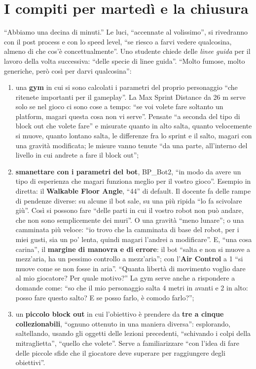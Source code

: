 \section{I compiti per martedì e la chiusura}
\label{ue13:sec:compiti}

``Abbiamo una decina di minuti.'' Le luci, ``accennate al volissimo'', si rivedranno con il
post process e con lo speed level, ``se riesco a farvi vedere qualcosina, almeno di che
cos'è concettualmente''. Uno studente chiede delle \emph{linee guida} per il lavoro della
volta successiva: ``delle specie di linee guida''. ``Molto fumose, molto generiche, però così
per darvi qualcosina'':
\begin{enumerate}
  \item una \textbf{gym} in cui si sono calcolati i parametri del proprio personaggio ``che
        ritenete importanti per il gameplay''. La Max Sprint Distance da 26 m serve solo se
        nel gioco ci sono cose a tempo: ``se voi volete fare soltanto un platform, magari
        questa cosa non vi serve''. Pensate ``a seconda del tipo di block out che volete
        fare'' e misurate quanto in alto salta, quanto velocemente si muove, quanto lontano
        salta, le differenze fra lo sprint e il salto, magari con una gravità modificata;
        le misure vanno tenute ``da una parte, all'interno del livello in cui andrete a fare
        il block out'';
  \item \textbf{smanettare con i parametri del bot}, BP\_Bot2, ``in modo da avere un tipo di
        esperienza che magari funziona meglio per il vostro gioco''. Esempio in diretta: il
        \textbf{Walkable Floor Angle}, ``44'' di default. Il docente fa delle rampe di
        pendenze diverse: su alcune il bot sale, su una più ripida ``lo fa scivolare giù''.
        Così si possono fare ``delle parti in cui il vostro robot non può andare, che non
        sono semplicemente dei muri''. O una gravità ``meno lunare''; o una camminata più
        veloce: ``io trovo che la camminata di base del robot, per i miei gusti, sia un po'
        lenta, quindi magari l'andrei a modificare''. E, ``una cosa carina'', il
        \textbf{margine di manovra e di errore}: il bot ``salta e non si muove a mezz'aria,
        ha un pessimo controllo a mezz'aria''; con l'\textbf{Air Control} a 1 ``si muove come
        se non fosse in aria''. ``Quanta libertà di movimento voglio dare al mio giocatore? Per
        quale motivo?'' La gym serve anche a rispondere a domande come: ``so che il mio
        personaggio salta 4 metri in avanti e 2 in alto: posso fare questo salto? E se posso
        farlo, è comodo farlo?'';
  \item un \textbf{piccolo block out} in cui l'obiettivo è prendere da \textbf{tre a cinque
        collezionabili}, ``ognuno ottenuto in una maniera diversa'': esplorando,
        saltellando, usando gli oggetti delle lezioni precedenti, ``schivando i colpi della
        mitraglietta'', ``quello che volete''. Serve a familiarizzare ``con l'idea di fare delle
        piccole sfide che il giocatore deve superare per raggiungere degli obiettivi''.
\end{enumerate}

